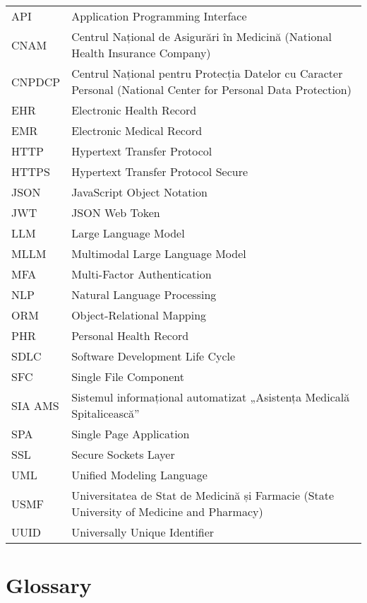 \begin{tabular}{p{} p{}}
API & Application Programming Interface \\
CNAM & Centrul Național de Asigurări în Medicină (National Health Insurance Company) \\
CNPDCP & Centrul Național pentru Protecția Datelor cu Caracter Personal (National Center for Personal Data Protection) \\
EHR & Electronic Health Record \\
EMR & Electronic Medical Record \\
HTTP & Hypertext Transfer Protocol \\
HTTPS & Hypertext Transfer Protocol Secure \\
JSON & JavaScript Object Notation \\
JWT & JSON Web Token \\
LLM & Large Language Model \\
MLLM & Multimodal Large Language Model \\
MFA & Multi-Factor Authentication \\
NLP & Natural Language Processing \\
ORM & Object-Relational Mapping \\
PHR & Personal Health Record \\
SDLC & Software Development Life Cycle \\
SFC & Single File Component \\
SIA AMS & Sistemul informațional automatizat „Asistența Medicală Spitalicească” \\
SPA & Single Page Application \\
SSL & Secure Sockets Layer \\
UML & Unified Modeling Language \\
USMF & Universitatea de Stat de Medicină și Farmacie (State University of Medicine and Pharmacy) \\
UUID & Universally Unique Identifier \\
\end{tabular}

\chapter*{Glossary}

